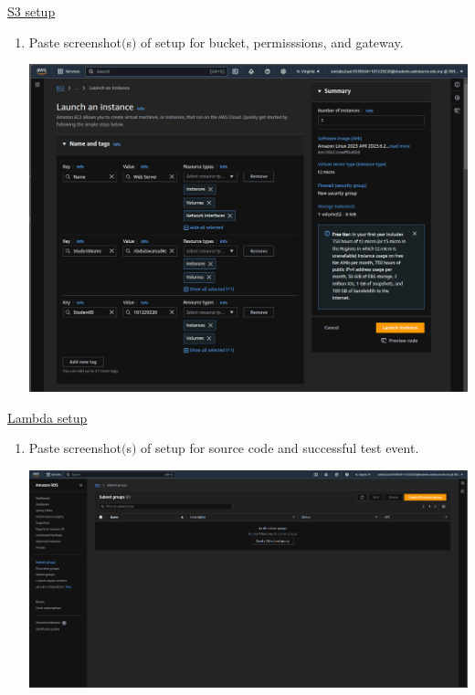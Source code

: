 \documentclass[11pt]{article}
\begin{document}
\noindent\underline{S3 setup}
\begin{enumerate}[resume]
    \item Paste screenshot$($s$)$ of setup for bucket, permisssions, and gateway. \\
    \vspace{5mm}

    {\centering
    \includegraphics[width=5.8in]{pics/15.png}
    }

\end{enumerate}




\newpage
\noindent\underline{Lambda setup}    
\begin{enumerate}[resume]
    \item Paste screenshot$($s$)$ of setup for source code and successful test event. 
    
    \vspace{2mm}

    {\centering
    \includegraphics[width=5.8in]{pics/23.png}
    }



\end{enumerate}
\end{document}

